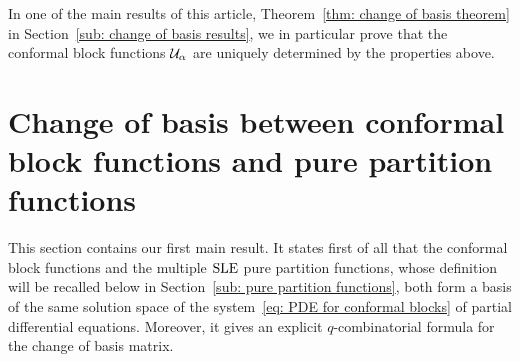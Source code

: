 \documentclass[oneside,english]{amsart}
\numberwithin{equation}{section}
\numberwithin{figure}{section}
\theoremstyle{plain}
\theoremstyle{plain}
\theoremstyle{plain}
\theoremstyle{remark}
\theoremstyle{plain}
\theoremstyle{plain}
\theoremstyle{plain}
\theoremstyle{plain}
\theoremstyle{plain}
\theoremstyle{plain}
\theoremstyle{plain}
\theoremstyle{plain}
\newcommand{\red}[1]{{\color{red} #1}}
\begin{document}
In one of the main results of this article, Theorem~\ref{thm: change of basis theorem} in Section~\ref{sub: change of basis results}, 
we in particular prove that the conformal block functions $\mathcal{U}_{\alpha}$ are uniquely determined by 
the properties above.

\bigskip

\section{Change of basis between conformal block functions and pure partition functions}
\label{sec: change of basis}



This section contains our first main result. It states first of all that
the conformal block functions and the multiple $\mathrm{SLE}$ pure partition functions, 
whose definition will be recalled below in Section~\ref{sub: pure partition functions}, both
form a basis of the same solution space of the system~\eqref{eq: PDE for conformal blocks} of partial differential equations.
Moreover, it gives an explicit $q$-combinatorial formula for the change of basis matrix.
% 
% 
\end{document}
